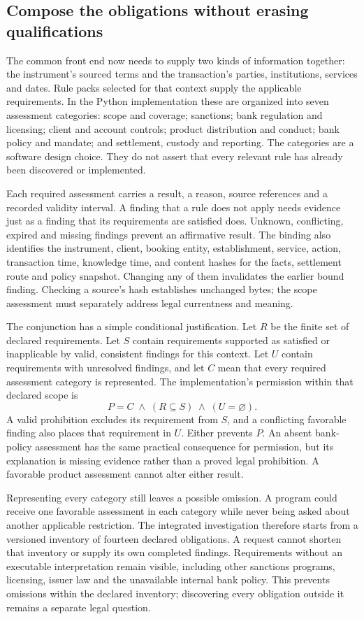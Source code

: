 \documentclass[12pt,a4paper,oneside,openany]{book}
\begin{document}
\subsection{Compose the obligations without erasing qualifications}

The common front end now needs to supply two kinds of information together:
the instrument's sourced terms and the transaction's parties, institutions,
services and dates. Rule packs selected for that context supply the applicable
requirements. In the Python implementation these are organized into seven
assessment categories: scope and coverage; sanctions; bank regulation and
licensing; client and account controls; product distribution and conduct; bank
policy and mandate; and settlement, custody and reporting. The categories are
a software design choice. They do not assert that every relevant rule has
already been discovered or implemented.

Each required assessment carries a result, a reason, source references and a
recorded validity interval. A finding that a rule does not apply needs evidence
just as a finding that its requirements are satisfied does. Unknown, conflicting,
expired and missing findings prevent an affirmative result. The binding also
identifies the instrument, client, booking entity, establishment, service,
action, transaction time, knowledge time, and content hashes for the facts,
settlement route and policy snapshot. Changing any of them invalidates the
earlier bound finding. Checking a source's hash establishes unchanged bytes;
the scope assessment must separately address legal currentness and meaning.

The conjunction has a simple conditional justification. Let $R$ be the finite
set of declared requirements. Let $S$ contain requirements supported as satisfied
or inapplicable by valid, consistent findings for this context. Let $U$ contain
requirements with unresolved findings, and let $C$ mean that every required
assessment category is represented. The implementation's permission within
that declared scope is
\[
   P = C \;\land\; (R\subseteq S) \;\land\; (U=\varnothing).
\]
A valid prohibition excludes its requirement from $S$, and a conflicting
favorable finding also places that requirement in $U$. Either prevents $P$.
An absent bank-policy assessment has the same practical consequence for
permission, but its explanation is missing evidence rather than a proved legal
prohibition. A favorable product assessment cannot alter either result.

Representing every category still leaves a possible omission. A program could
receive one favorable assessment in each category while never being asked
about another applicable restriction. The integrated investigation therefore
starts from a versioned inventory of fourteen declared obligations. A request
cannot shorten that inventory or supply its own completed findings. Requirements
without an executable interpretation remain visible, including other sanctions
programs, licensing, issuer law and the unavailable internal bank policy. This
prevents omissions within the declared inventory; discovering every obligation
outside it remains a separate legal question.
\end{document}

